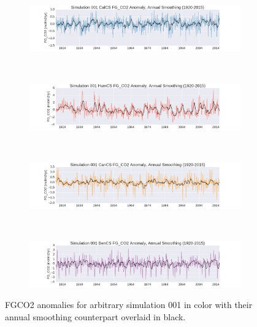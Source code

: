 \documentclass[12pt]{article}
\begin{document}
\clearpage
\begin{figure}[!h]
	\centering
	\begin{subfigure}[b]{\textwidth}
		\centering
		\includegraphics[width=\linewidth]{../../figs/calcs/timeseries/calcs-filtered-fgco2-series-example.png}
	\end{subfigure} \\
	\begin{subfigure}[b]{\textwidth}
		\centering
		\includegraphics[width=\linewidth]{../../figs/humcs/timeseries/humcs-filtered-fgco2-series-example.png}
	\end{subfigure} \\
	\begin{subfigure}[b]{\textwidth}
		\centering
		\includegraphics[width=\linewidth]{../../figs/cancs/timeseries/cancs-filtered-fgco2-series-example.png}
	\end{subfigure} \\
	\begin{subfigure}[b]{\textwidth}
		\centering
		\includegraphics[width=\linewidth]{../../figs/bencs/timeseries/bencs-filtered-fgco2-series-example.png}
	\end{subfigure}
	\caption{FGCO2 anomalies for arbitrary simulation 001 in color with their annual smoothing counterpart overlaid in black.}
	\label{smoothed:series}
\end{figure}
\end{document}

